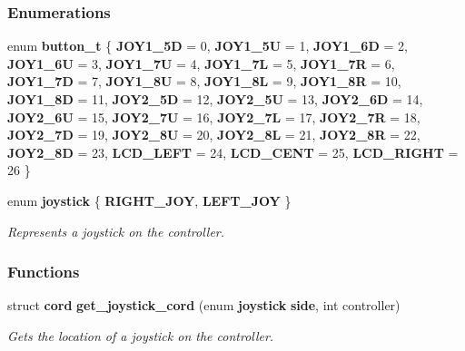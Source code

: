 \subsubsection*{Enumerations}
\begin{DoxyCompactItemize}
\item 
enum \textbf{ button\+\_\+t} \{ \newline
\textbf{ J\+O\+Y1\+\_\+5D} = 0, 
\textbf{ J\+O\+Y1\+\_\+5U} = 1, 
\textbf{ J\+O\+Y1\+\_\+6D} = 2, 
\textbf{ J\+O\+Y1\+\_\+6U} = 3, 
\newline
\textbf{ J\+O\+Y1\+\_\+7U} = 4, 
\textbf{ J\+O\+Y1\+\_\+7L} = 5, 
\textbf{ J\+O\+Y1\+\_\+7R} = 6, 
\textbf{ J\+O\+Y1\+\_\+7D} = 7, 
\newline
\textbf{ J\+O\+Y1\+\_\+8U} = 8, 
\textbf{ J\+O\+Y1\+\_\+8L} = 9, 
\textbf{ J\+O\+Y1\+\_\+8R} = 10, 
\textbf{ J\+O\+Y1\+\_\+8D} = 11, 
\newline
\textbf{ J\+O\+Y2\+\_\+5D} = 12, 
\textbf{ J\+O\+Y2\+\_\+5U} = 13, 
\textbf{ J\+O\+Y2\+\_\+6D} = 14, 
\textbf{ J\+O\+Y2\+\_\+6U} = 15, 
\newline
\textbf{ J\+O\+Y2\+\_\+7U} = 16, 
\textbf{ J\+O\+Y2\+\_\+7L} = 17, 
\textbf{ J\+O\+Y2\+\_\+7R} = 18, 
\textbf{ J\+O\+Y2\+\_\+7D} = 19, 
\newline
\textbf{ J\+O\+Y2\+\_\+8U} = 20, 
\textbf{ J\+O\+Y2\+\_\+8L} = 21, 
\textbf{ J\+O\+Y2\+\_\+8R} = 22, 
\textbf{ J\+O\+Y2\+\_\+8D} = 23, 
\newline
\textbf{ L\+C\+D\+\_\+\+L\+E\+FT} = 24, 
\textbf{ L\+C\+D\+\_\+\+C\+E\+NT} = 25, 
\textbf{ L\+C\+D\+\_\+\+R\+I\+G\+HT} = 26
 \}
\item 
enum \textbf{ joystick} \{ \textbf{ R\+I\+G\+H\+T\+\_\+\+J\+OY}, 
\textbf{ L\+E\+F\+T\+\_\+\+J\+OY}
 \}\begin{DoxyCompactList}\small\item\em Represents a joystick on the controller. \end{DoxyCompactList}
\end{DoxyCompactItemize}
\subsubsection*{Functions}
\begin{DoxyCompactItemize}
\item 
struct \textbf{ cord} \textbf{ get\+\_\+joystick\+\_\+cord} (enum \textbf{ joystick} \textbf{ side}, int controller)
\begin{DoxyCompactList}\small\item\em Gets the location of a joystick on the controller. \end{DoxyCompactList}\end{DoxyCompactItemize}


